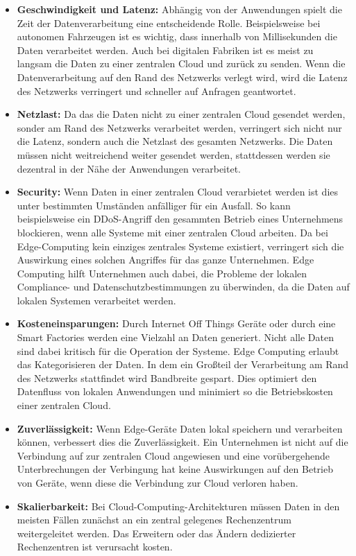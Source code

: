 \documentclass[runningheads]{llncs}
\numberwithin{figure}{section}
\begin{document}
\begin{itemize}
  \item \textbf{Geschwindigkeit und Latenz:} Abhängig von der Anwendungen spielt die Zeit der Datenverarbeitung eine
  entscheidende Rolle. Beispielsweise bei autonomen Fahrzeugen ist es wichtig, dass innerhalb von Millisekunden die Daten
  verarbeitet werden. Auch bei digitalen Fabriken ist es meist zu langsam die Daten zu einer zentralen Cloud und zurück
  zu senden. 
  Wenn die Datenverarbeitung auf den Rand des Netzwerks verlegt wird, wird die Latenz des Netzwerks verringert und schneller
  auf Anfragen geantwortet. 
  \item \textbf{Netzlast:} Da das die Daten nicht zu einer zentralen Cloud gesendet werden, sonder am Rand des Netzwerks 
  verarbeitet werden, verringert sich nicht nur die Latenz, sondern auch die Netzlast des gesamten Netzwerks. 
  Die Daten müssen nicht weitreichend weiter gesendet werden, stattdessen werden sie 
  dezentral in der Nähe der Anwendungen verarbeitet.
  \item \textbf{Security:} Wenn Daten in einer zentralen Cloud verarbietet werden ist dies unter bestimmten Umständen anfälliger
  für ein Ausfall.
  So kann beispielsweise ein DDoS-Angriff den gesammten Betrieb eines Unternehmens blockieren, wenn alle Systeme mit einer zentralen
  Cloud arbeiten. Da bei Edge-Computing kein einziges zentrales Systeme existiert, verringert sich die Auswirkung eines solchen
  Angriffes für das ganze Unternehmen.  
  Edge Computing hilft Unternehmen auch dabei, die Probleme der lokalen Compliance- und Datenschutzbestimmungen zu überwinden,
  da die Daten auf lokalen Systemen verarbeitet werden.
  \item \textbf{Kosteneinsparungen:} Durch Internet Off Things Geräte oder durch eine Smart Factories werden
  eine Vielzahl an Daten generiert. Nicht alle Daten sind dabei kritisch für die Operation der Systeme. Edge Computing erlaubt
  das Kategorisieren der Daten. In dem ein Großteil der Verarbeitung am Rand des Netzwerks stattfindet wird Bandbreite gespart.
  Dies optimiert den Datenfluss von lokalen Anwendungen und minimiert so die Betriebskosten einer zentralen Cloud.
  \item \textbf{Zuverlässigkeit:} Wenn Edge-Geräte Daten lokal speichern und verarbeiten können, verbessert dies die Zuverlässigkeit.
  Ein Unternehmen ist nicht auf die Verbindung auf zur zentralen Cloud angewiesen und eine vorübergehende Unterbrechungen der 
  Verbingung hat keine Auswirkungen auf den Betrieb von Geräte, wenn diese die Verbindung zur Cloud verloren haben.
  \item \textbf{Skalierbarkeit:}
  Bei Cloud-Computing-Architekturen müssen Daten in den meisten Fällen zunächst an ein zentral gelegenes Rechenzentrum
  weitergeleitet werden. Das Erweitern oder das Ändern dedizierter Rechenzentren ist verursacht kosten. 
\end{itemize}
\newpage
\end{document}
